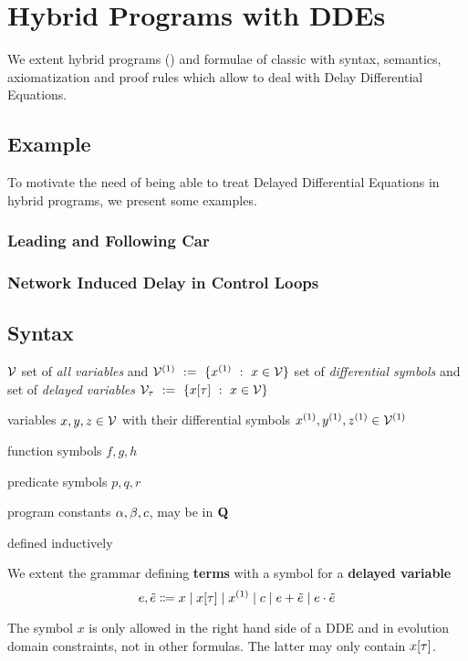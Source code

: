 \chapter{Hybrid Programs with DDEs}\label{hybrid-programs-with-ddes}

We extent hybrid programs (\HPs) and formulae of classic \dL with syntax, semantics, axiomatization and proof rules which allow to deal with Delay Differential Equations.

\section{Example}
    \label{example-hp-cars}
    To motivate the need of being able to treat Delayed Differential Equations in hybrid programs, we present some examples.

    \subsection{Leading and Following Car}

    \subsection{Network Induced Delay in Control Loops}

\section{Syntax}
    \label{sec:syntax}

    $\mathcal{V}$ set of \textit{all variables} and $\diffvars\defeq\{\D{x} \with x\in\allvars\}$ set of \textit{differential symbols} and set of \textit{delayed variables} $\mathcal{V}_\tau~\mathrel{\mathop{:}}=~\{x[\tau] ~\mathrel{\mathop{:}}~ x\in\mathcal{V}\}$

    variables $x,y,z\in\mathcal{V}$ with their differential symbols $\D{x},\D{y},\D{z}\in\D{\allvars}$

    function symbols $f,g,h$

    predicate symbols $p,q,r$

    program constants $\alpha, \beta, c$, may be in $\mathbf{Q}$

    defined inductively

    \begin{definition}[Terms]
        \label{def:syntax-terms}

        We extent the grammar defining \textbf{terms} with a symbol for a \textbf{delayed variable}
        \begin{equation}
            \astrm,\bstrm \Coloneqq x \mid \xtau \mid \D{x} \mid c \mid \astrm+\bstrm \mid \astrm\cdot\bstrm
        \end{equation}


        The symbol $x$ is only allowed in the right hand side of a DDE and in evolution domain constraints, not in other formulas. The latter may only contain $x[\tau]$.

    \end{definition}

